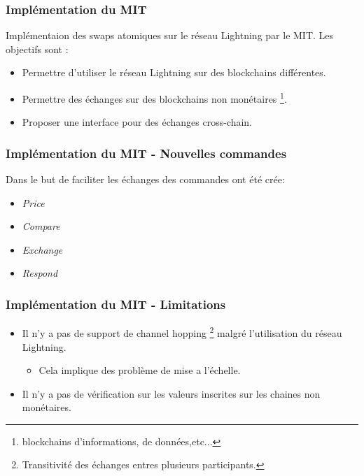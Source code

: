 \begin{frame}
	\frametitle{Implémentation du MIT}
	Implémentaion des swaps atomiques sur le réseau Lightning par le MIT. Les objectifs sont :
	\newline
	\begin{itemize}
		\item Permettre d'utiliser le réseau Lightning sur des blockchains différentes.
		\item Permettre des échanges sur des blockchains non monétaires \footnote{blockchains d'informations, de données,etc...}.
		\item Proposer une interface pour des échanges cross-chain.
	\end{itemize}

\end{frame}


\begin{frame}
	\frametitle{Implémentation du MIT - Nouvelles commandes}
	Dans le but de faciliter les échanges des commandes ont été crée:
	\newline
	\begin{itemize}
		\item \textit{Price}
		\item \textit{Compare}
		\item \textit{Exchange}
		\item \textit{Respond}
	\end{itemize}
\end{frame}


\begin{frame}
	\frametitle{Implémentation du MIT - Limitations}


	\begin{itemize}
		\item Il n'y a pas de support de channel hopping \footnote{Transitivité des échanges entres plusieurs participants.} malgré l'utilisation du réseau Lightning.
		      \begin{itemize}
			      \item Cela implique des problème de mise a l'échelle.
		      \end{itemize}
		\item Il n'y a pas de vérification sur les valeurs inscrites sur les chaines non monétaires.
	\end{itemize}
\end{frame}
